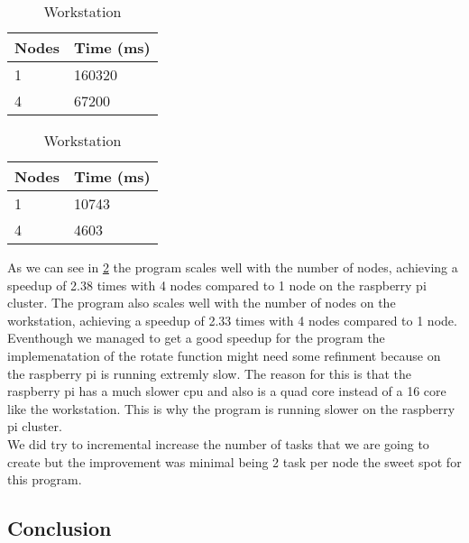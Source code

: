 \documentclass[12pt]{article}
\begin{document}
\begin{table}[H]
  \caption{Rotate Image - 2 Tasks per Node Approach}\label{tab:rotate-image}
  \begin{center}
    \begin{minipage}{0.45\linewidth}
      \caption{Raspberry Pi Cluster}
      \begin{tabular}[c]{l|l}
        \textbf{Nodes} & \textbf{Time (ms)} \\
        \hline
        1 & 160320 \\
        4 & 67200 \\
      \end{tabular}
    \end{minipage}
    \hspace{0.05\linewidth}
    \begin{minipage}{0.45\linewidth}
      \caption{Workstation}
      \begin{tabular}[c]{l|l}
        \textbf{Nodes} & \textbf{Time (ms)} \\
        \hline
        1 & 10743 \\
        4 & 4603 \\
      \end{tabular}
    \end{minipage}
  \end{center}
\end{table}

As we can see in \ref{tab:rotate-image} the program scales well with the number of nodes, achieving a speedup of 2.38 times with 4 nodes compared to 1 node on the raspberry pi cluster. The program also scales well with the number of nodes on the workstation, achieving a speedup of 2.33 times with 4 nodes compared to 1 node. Eventhough we managed to get a good speedup for the program the implemenatation of the rotate function might need some refinment because on the raspberry pi is running extremly slow. The reason for this is that the raspberry pi has a much slower cpu and also is a quad core instead of a 16 core like the workstation. This is why the program is running slower on the raspberry pi cluster.\\

We did try to incremental increase the number of tasks that we are going to create but the improvement was minimal being 2 task per node the sweet spot for this program.

\subsection{Conclusion}
\end{document}
